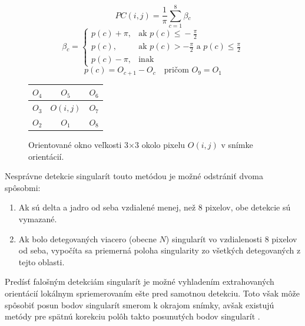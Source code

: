   \begin{equation}
    PC(i,j) = \frac{1}{\pi{}} \sum_{c=1}^{8}{\beta{}_c}
    \label{eq:poincare_1}
  \end{equation}
  \begin{equation}
    \beta{}_c = 
    \begin{cases}
      p(c) + \pi{},  & \text{ak } p(c) \leq{} - \frac{\pi{}}{2} \\
      p(c),          & \text{ak } p(c) >  - \frac{\pi{}}{2} \text{ a } p(c) \leq{} \frac{\pi{}}{2} \\
      p(c) - \pi{},  & \text{inak}
    \end{cases}
    \label{eq:poincare_2}
  \end{equation}
  \begin{equation}
    p(c) = O_{c+1} - O_c \quad \text{pričom } O_9 = O_1
    \label{eq:poincare_3}
  \end{equation}

  \begin{figure}[h]
    \centering
      \begin{tabular}{ | l | c | r | }
        \hline
        $O_4$ & $O_5$ & $O_6$ \\ \hline
        $O_3$ & $O(i,j)$ & $O_7$ \\ \hline
        $O_2$ & $O_1$ & $O_8$ \\
        \hline
      \end{tabular}
    \caption{Orientované okno veľkosti $3$$\times{}$$3$ okolo pixelu $O(i,j)$ v snímke orientácií.}
    \label{obr:okno_orientacie}
  \end{figure}
  
  Nesprávne detekcie singularít touto metódou je možné odstrániť dvoma spôsobmi:
  \begin{enumerate}
    \item Ak sú delta a jadro od seba vzdialené menej, než 8 pixelov, obe detekcie sú vymazané.
    \item Ak bolo detegovaných viacero (obecne $N$) singularít vo vzdialenosti 8 pixelov od seba, vypočíta sa priemerná poloha singularity zo všetkých
          detegovaných z tejto oblasti.
  \end{enumerate}
  Predísť falošným detekciám singularít je možné vyhladením extrahovaných orientácií lokálnym spriemerovaním ešte pred samotnou detekciu. Toto však môže
  spôsobiť posun bodov singularít smerom k okrajom snímky, avšak existujú metódy pre spätnú korekciu polôh takto posunutých bodov singularít \cite{Handbook}.

